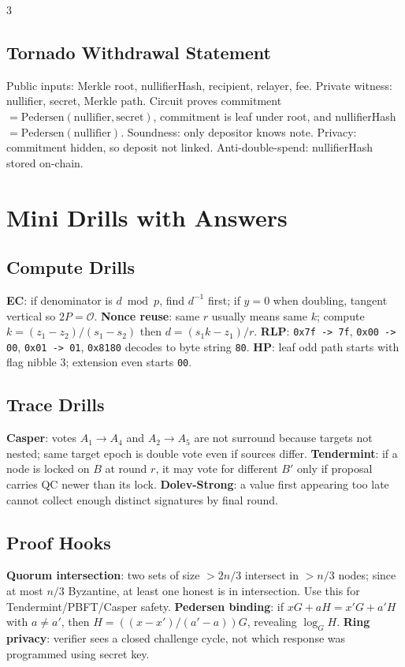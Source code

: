 \documentclass[8pt]{extarticle}
\newcommand{\term}[1]{\textbf{#1}}
\begin{document}
\begin{multicols*}{3}
\subsection{Tornado Withdrawal Statement}
Public inputs: Merkle root, nullifierHash, recipient, relayer, fee. Private witness: nullifier, secret, Merkle path. Circuit proves commitment $=\mathrm{Pedersen}(\mathrm{nullifier},\mathrm{secret})$, commitment is leaf under root, and nullifierHash $=\mathrm{Pedersen}(\mathrm{nullifier})$. Soundness: only depositor knows note. Privacy: commitment hidden, so deposit not linked. Anti-double-spend: nullifierHash stored on-chain.

\section{Mini Drills with Answers}
\subsection{Compute Drills}
\term{EC}: if denominator is $d\bmod p$, find $d^{-1}$ first; if $y=0$ when doubling, tangent vertical so $2P=\mathcal O$. \term{Nonce reuse}: same $r$ usually means same $k$; compute $k=(z_1-z_2)/(s_1-s_2)$ then $d=(s_1k-z_1)/r$. \term{RLP}: \texttt{0x7f -> 7f}, \texttt{0x00 -> 00}, \texttt{0x01 -> 01}, \texttt{0x8180} decodes to byte string \texttt{80}. \term{HP}: leaf odd path starts with flag nibble 3; extension even starts \texttt{00}.

\subsection{Trace Drills}
\term{Casper}: votes $A_1\to A_4$ and $A_2\to A_5$ are not surround because targets not nested; same target epoch is double vote even if sources differ. \term{Tendermint}: if a node is locked on $B$ at round $r$, it may vote for different $B'$ only if proposal carries QC newer than its lock. \term{Dolev-Strong}: a value first appearing too late cannot collect enough distinct signatures by final round.

\subsection{Proof Hooks}
\term{Quorum intersection}: two sets of size $>2n/3$ intersect in $>n/3$ nodes; since at most $n/3$ Byzantine, at least one honest is in intersection. Use this for Tendermint/PBFT/Casper safety. \term{Pedersen binding}: if $xG+aH=x'G+a'H$ with $a\ne a'$, then $H=((x-x')/(a'-a))G$, revealing $\log_GH$. \term{Ring privacy}: verifier sees a closed challenge cycle, not which response was programmed using secret key.


\end{multicols*}
\end{document}
